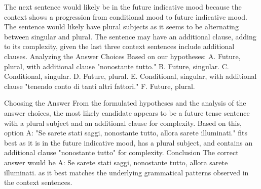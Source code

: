 The next sentence would likely be in the future indicative mood because the context shows a progression from conditional mood to future indicative mood.
The sentence would likely have plural subjects as it seems to be alternating between singular and plural.
The sentence may have an additional clause, adding to its complexity, given the last three context sentences include additional clauses.
Analyzing the Answer Choices
Based on our hypotheses:
A. Future, plural, with additional clause "nonostante tutto."
B. Future, singular.
C. Conditional, singular.
D. Future, plural.
E. Conditional, singular, with additional clause "tenendo conto di tanti altri fattori."
F. Future, plural.

Choosing the Answer
From the formulated hypotheses and the analysis of the answer choices, the most likely candidate appears to be a future tense sentence with a plural subject and an additional clause for complexity.
Based on this, option A: "Se sarete stati saggi, nonostante tutto, allora sarete illuminati." fits best as it is in the future indicative mood, has a plural subject, and contains an additional clause "nonostante tutto" for complexity.
Conclusion
The correct answer would be A: Se sarete stati saggi, nonostante tutto, allora sarete illuminati. as it best matches the underlying grammatical patterns observed in the context sentences.